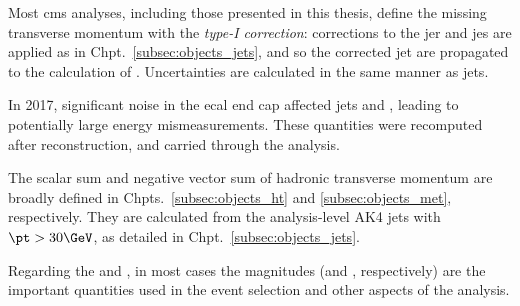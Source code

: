 Most \acrshort{cms} analyses, including those presented in this thesis, define the missing transverse momentum with the \emph{type-I correction}: corrections to the \acrshort{jer} and \acrshort{jes} are applied as in Chpt.~\ref{subsec:objects_jets}, and so the corrected \gls{jet} \ptvec are propagated to the calculation of \ptvecmiss. Uncertainties are calculated in the same manner as \glspl{jet}.

In 2017, significant noise in the \acrshort{ecal} end cap affected \glspl{jet} and \ptmiss, leading to potentially large energy mismeasurements. These quantities were recomputed after reconstruction, and carried through the analysis.

The scalar sum \HT and negative vector sum of hadronic transverse momentum \htvecmiss are broadly defined in Chpts.~\ref{subsec:objects_ht} and \ref{subsec:objects_met}, respectively. They are calculated from the analysis-level AK4 \glspl{jet} with $\pt > \text{30}\GeV$, as detailed in Chpt.~\ref{subsec:objects_jets}.

Regarding the \ptvecmiss and \htvecmiss, in most cases the magnitudes (\ptmiss and \mht, respectively) are the important quantities used in the event selection and other aspects of the analysis.


